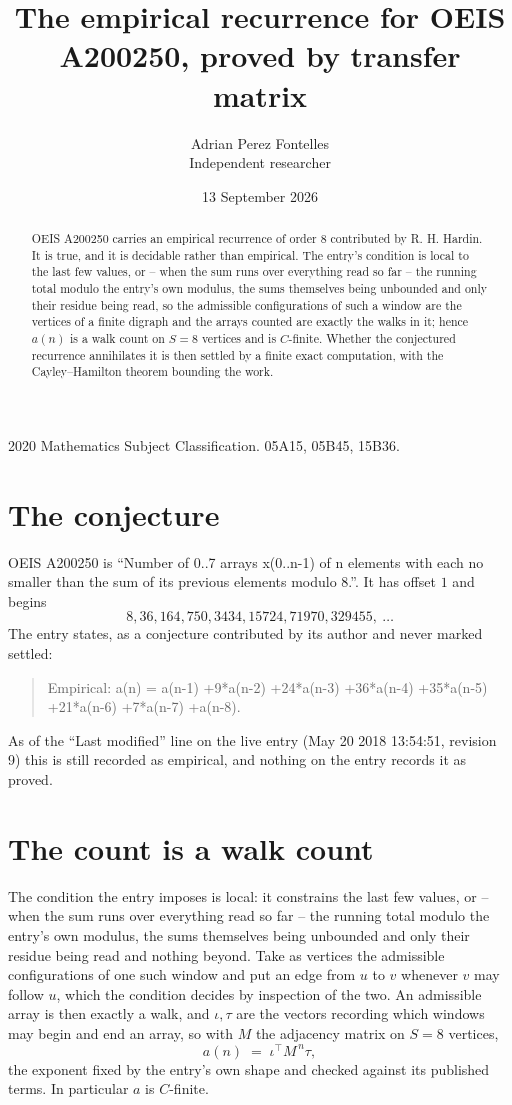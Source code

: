 \documentclass[11pt,a4paper]{article}
\title{The empirical recurrence for OEIS A200250, proved by transfer matrix}
\author{Adrian Perez Fontelles\\ \small Independent researcher}
\date{13 September 2026}
\theoremstyle{plain}
\theoremstyle{definition}
\begin{document}
\maketitle

\begin{abstract}
OEIS A200250 carries an empirical recurrence of order $8$ contributed by R. H. Hardin. It is
true, and it is decidable rather than empirical. The entry's condition is local to the last few values, or -- when the sum runs over everything read so far -- the running total modulo the entry's own modulus, the sums themselves being unbounded and only their residue being read, so
the admissible configurations of such a window are the vertices of a finite digraph and the
arrays counted are exactly the walks in it; hence $a(n)$ is a walk count on $S=8$ vertices
and is $C$-finite. Whether the conjectured recurrence annihilates it is then settled by a
finite exact computation, with the Cayley--Hamilton theorem bounding the work.
\end{abstract}

\noindent\small 2020 Mathematics Subject Classification. 05A15, 05B45, 15B36.\normalsize

\section{The conjecture}

OEIS A200250 is ``Number of 0..7 arrays x(0..n-1) of n elements with each no smaller than the sum of its previous elements modulo 8.''. It has offset $1$ and begins
\[
8, 36, 164, 750, 3434, 15724, 71970, 329455,\ \dots
\]
The entry states, as a conjecture contributed by its author and never marked settled:
\begin{quote}
Empirical: a(n) = a(n-1) +9*a(n-2) +24*a(n-3) +36*a(n-4) +35*a(n-5) +21*a(n-6) +7*a(n-7) +a(n-8).
\end{quote}
As of the ``Last modified'' line on the live entry (May 20 2018 13:54:51, revision 9) this is still
recorded as empirical, and nothing on the entry records it as proved.

\section{The count is a walk count}

The condition the entry imposes is local: it constrains the last few values, or -- when the sum runs over everything read so far -- the running total modulo the entry's own modulus, the sums themselves being unbounded and only their residue being read and nothing beyond. Take as vertices the admissible configurations of one such window and put an edge from $u$ to $v$ whenever $v$ may follow $u$, which the condition decides by inspection of the two.
An admissible array is then exactly a walk, and $\iota,\tau$ are the vectors recording which windows may begin and end an array, so with $M$ the adjacency matrix on $S=8$ vertices,
\[
a(n)\;=\;\iota^{\!\top}M^{\,n}\tau ,
\]
the exponent fixed by the entry's own shape and checked against its published terms. In
particular $a$ is $C$-finite.
\end{document}
